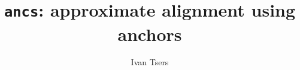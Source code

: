 \documentclass[a4paper]{article}
\begin{document}
\pagestyle{noweb}

\title{\texttt{ancs}: approximate alignment using anchors}
\author{Ivan Tsers}
\maketitle
\tableofcontents



%


\end{document}
